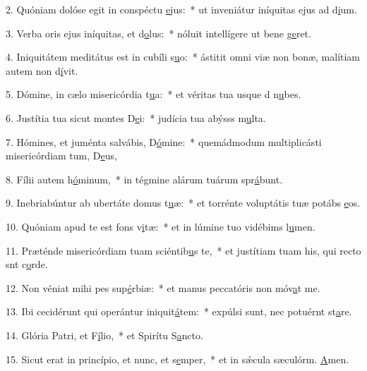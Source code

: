 2. Quóniam dolóse egit in conspéctu \uline{e}jus:~* ut inveniátur iníquitas ejus ad d\uline{i}um.\par 
3. Verba oris ejus iníquitas, et d\uline{o}lus:~* nóluit intellígere ut bene g\uline{e}ret.\par 
4. Iniquitátem meditátus est in cubíli s\uline{u}o:~* ástitit omni viæ non bonæ, malítiam autem non d\uline{í}vit.\par 
5. Dómine, in cælo misericórdia t\uline{u}a:~* et véritas tua usque d n\uline{u}bes.\par 
6. Justítia tua sicut montes D\uline{e}i:~* judícia tua abýsss m\uline{u}lta.\par 
7. Hómines, et juménta salvábis, D\uline{ó}mine:~* quemádmodum multiplicásti misericórdiam tum, D\uline{e}us,\par 
8. Fílii autem h\uline{ó}minum,~* in tégmine alárum tuárum spr\uline{á}bunt.\par 
9. Inebriabúntur ab ubertáte domus t\uline{u}æ:~* et torrénte voluptátis tuæ potábs \uline{e}os.\par 
10. Quóniam apud te est fons v\uline{i}tæ:~* et in lúmine tuo vidébims l\uline{u}men.\par 
11. Præténde misericórdiam tuam sciéntib\uline{u}s te,~* et justítiam tuam his, qui recto snt c\uline{o}rde.\par 
12. Non véniat mihi pes sup\uline{é}rbiæ:~* et manus peccatóris non móv\uline{a}t me.\par 
13. Ibi cecidérunt qui operántur iniquit\uline{á}tem:~* expúlsi sunt, nec potuérnt st\uline{a}re.\par 
14. Glória Patri, et F\uline{í}lio,~* et Spirítu S\uline{a}ncto.\par 
15. Sicut erat in princípio, et nunc, et s\uline{e}mper,~* et in sǽcula sæculórm. \uline{A}men.\par 
